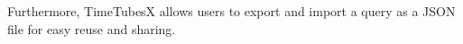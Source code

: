 
Furthermore, TimeTubesX allows users to export and import a query as a JSON file for easy reuse and sharing.


